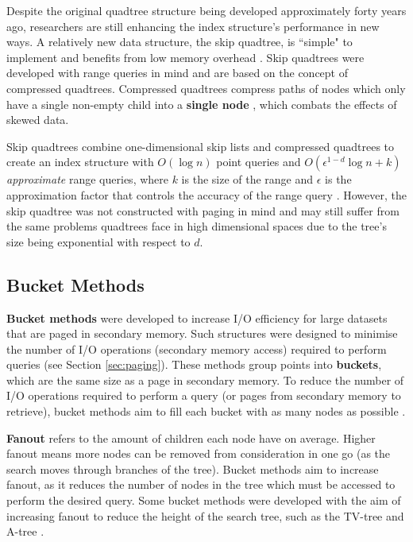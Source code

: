 Despite the original quadtree structure being developed approximately forty years ago, researchers are still enhancing the index structure's performance in new ways. A relatively new data structure, the skip quadtree, is ``simple" to implement and benefits from low memory overhead \cite{skip-quadtree}. Skip quadtrees were developed with range queries in mind and are based on the concept of compressed quadtrees. Compressed quadtrees compress paths of nodes which only have a single non-empty child into a \textbf{single node} \cite{compressed-quadtree}, which combats the effects of skewed data.

Skip quadtrees combine one-dimensional skip lists \cite{skip-quadtree} and compressed quadtrees to create an index structure with $O(\log n)$ point queries and $O(\epsilon^{1 - d} \log n + k)$ \textit{approximate} range queries, where $k$ is the size of the range and $\epsilon$ is the approximation factor that controls the accuracy of the range query \cite{skip-quadtree}. However, the skip quadtree was not constructed with paging in mind and may still suffer from the same problems quadtrees face in high dimensional spaces due to the tree's size being exponential with respect to $d$.


\subsection{Bucket Methods}
\label{sec:bucket-methods}

\textbf{Bucket methods} were developed to increase I/O efficiency for large datasets that are paged in secondary memory. Such structures were designed to minimise the number of I/O operations (secondary memory access) required to perform queries (see Section \ref{sec:paging}). These methods group points into \textbf{buckets}, which are the same size as a page in secondary memory. To reduce the number of I/O operations required to perform a query (or pages from secondary memory to retrieve), bucket methods aim to fill each bucket with as many nodes as possible \cite{md-structures-samet}.

\textbf{Fanout} refers to the amount of children each node have on average. Higher fanout means more nodes can be removed from consideration in one go (as the search moves through branches of the tree). Bucket methods aim to increase fanout, as it reduces the number of nodes in the tree which must be accessed to perform the desired query. Some bucket methods were developed with the aim of increasing fanout to reduce the height of the search tree, such as  the TV-tree \cite{tv-tree} and A-tree \cite{a-tree}.

